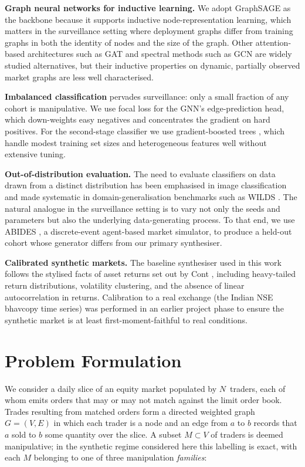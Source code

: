 \documentclass[10pt,twocolumn,letterpaper]{article}
\begin{document}
\textbf{Graph neural networks for inductive learning.} We adopt
GraphSAGE \cite{hamilton2017graphsage} as the backbone because it
supports inductive node-representation learning, which matters in the
surveillance setting where deployment graphs differ from training
graphs in both the identity of nodes and the size of the graph. Other
attention-based architectures such as GAT \cite{velickovic2018gat} and
spectral methods such as GCN \cite{kipf2017gcn} are widely studied
alternatives, but their inductive properties on dynamic, partially
observed market graphs are less well characterised.

\textbf{Imbalanced classification} pervades surveillance: only a small
fraction of any cohort is manipulative. We use focal loss
\cite{lin2017focal} for the GNN's edge-prediction head, which down-weights
easy negatives and concentrates the gradient on hard positives. For the
second-stage classifier we use gradient-boosted trees
\cite{friedman2001gradient}, which handle modest training set sizes and
heterogeneous features well without extensive tuning.

\textbf{Out-of-distribution evaluation.} The need to evaluate
classifiers on data drawn from a distinct distribution has been
emphasised in image classification \cite{recht2019imagenet} and made
systematic in domain-generalisation benchmarks such as WILDS
\cite{koh2021wilds}. The natural analogue in the surveillance setting
is to vary not only the seeds and parameters but also the underlying
data-generating process. To that end, we use ABIDES
\cite{byrd2019abides}, a discrete-event agent-based market simulator,
to produce a held-out cohort whose generator differs from our primary
synthesiser.

\textbf{Calibrated synthetic markets.} The baseline synthesiser used in
this work follows the stylised facts of asset returns set out by Cont
\cite{cont2001stylized}, including heavy-tailed return distributions,
volatility clustering, and the absence of linear autocorrelation in
returns. Calibration to a real exchange (the Indian NSE bhavcopy time
series) was performed in an earlier project phase to ensure the
synthetic market is at least first-moment-faithful to real conditions.

\section{Problem Formulation}
\label{sec:problem}

We consider a daily slice of an equity market populated by
\(N\)~traders, each of whom emits orders that may or may not match
against the limit order book. Trades resulting from matched orders
form a directed weighted graph \(G=(V,E)\) in which each trader is a
node and an edge from \(a\) to \(b\) records that \(a\) sold to \(b\)
some quantity over the slice. A subset \(M\subset V\) of traders is
deemed manipulative; in the synthetic regime considered here this
labelling is exact, with each \(M\) belonging to one of three
manipulation \emph{families}:
\end{document}
